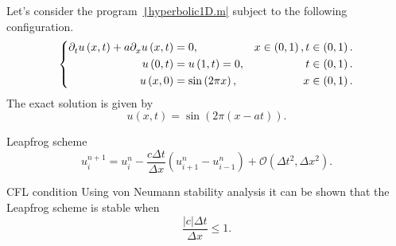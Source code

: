 \documentclass[
	8pt,
	professionalfonts,
	leqno,
	intlimits,
	c,
    aspectratio=1610,
]{beamer}
\begin{document}
\begin{frame}
    \frametitle{\secname}
    \begin{example}[Homogeneous]
        Let's consider the program~\href{https://raw.githubusercontent.com/carlosal1015/mole_examples/main/examples/octave/hyperbolic1D.m}{\texttt|hyperbolic1D.m|} subject to the following configuration.
        \begin{equation*}
            \left\{
            \begin{aligned}
                \difcp{u}{t}\left(x,t\right)+
                a\difcp{u}{x}\left(x,t\right) & =
                0,                            & x\in\left(0,1\right), t\in\left(0,1\right). \\
                u\left(0,t\right)             & =
                u\left(1,t\right)=0,          & t\in\left(0,1\right).                       \\
                u\left(x,0\right)             & =
                \sin\left(2\pi x\right),      & x\in\left(0,1\right).
            \end{aligned}
            \right.
        \end{equation*}
        The exact solution is given by
        \begin{equation*}
            u\left(x,t\right)=
            \sin
            \left(2\pi\left(x-at\right)\right).
        \end{equation*}
    \end{example}

    \begin{block}{Leapfrog scheme}
        \begin{equation*}
            u^{n+1}_{i}=
            u^{n}_{i}-
            \frac{c\Delta t}{\Delta x}
            \left(u^{n}_{i+1}-u^{n}_{i-1}\right)+
            \mathcal{O}\left(\Delta t^{2},\Delta x^{2}\right).
        \end{equation*}
    \end{block}

    \begin{alertblock}{CFL condition}
        Using von Neumann stability analysis it can be shown that the
        Leapfrog scheme is stable when
        \begin{equation*}
            \frac{\left|c\right|\Delta t}{\Delta x}\leq 1.
        \end{equation*}
    \end{alertblock}
\end{frame}
\end{document}
